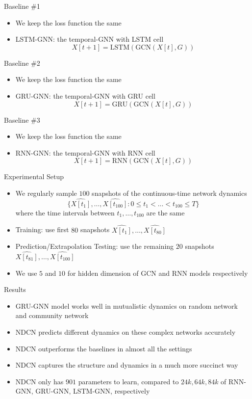 \documentclass{beamer}
\begin{document}
\begin{frame}{Baseline \#1}
\begin{itemize}
\item We keep the loss function the same
\item LSTM-GNN: the temporal-GNN with LSTM cell\[
X[t+1]=\text{LSTM}(\text{GCN}(X[t],G))
\]
\end{itemize}
\end{frame}

\begin{frame}{Baseline \#2}
\begin{itemize}
\item We keep the loss function the same
\item GRU-GNN: the temporal-GNN with GRU cell\[
X[t+1]=\text{GRU}(\text{GCN}(X[t],G))
\]
\end{itemize}
\end{frame}

\begin{frame}{Baseline \#3}
\begin{itemize}
\item We keep the loss function the same
\item RNN-GNN: the temporal-GNN with RNN cell\[
X[t+1]=\text{RNN}(\text{GCN}(X[t],G))
\]
\end{itemize}
\end{frame}

\begin{frame}{Experimental Setup}
\begin{itemize}
\item We regularly sample $100$ snapshots of the continuous-time network dynamics\[
\{\hat{X[t_1]},\dots,\hat{X[t_{100}]}:0\leqslant t_1<\dots<t_{100}\leqslant T\}
\]where the time intervals between $t_1,\dots,t_{100}$ are the same
\item Training: use first $80$ snapshots $\hat{X[t_1]},\dots,\hat{X[t_{80}]}$
\item Prediction/Extrapolation Testing: use the remaining $20$ snapshots $\hat{X[t_{81}]},\dots,\hat{X[t_{100}]}$
\item We use $5$ and $10$ for hidden dimension of GCN and RNN models respectively
\end{itemize}
\end{frame}

\begin{frame}{Results}
\begin{itemize}
\item GRU-GNN model works well in mutualistic dynamics on random network and community network
\item NDCN predicts different dynamics on these complex networks accurately
\item NDCN outperforms the baselines in almost all the settings
\item NDCN captures the structure and dynamics in a much more succinct way
\item NDCN only has $901$ parameters to learn, compared to $24k,64k,84k$ of RNN-GNN, GRU-GNN, LSTM-GNN, respectively
\end{itemize}
\end{frame}
\end{document}
